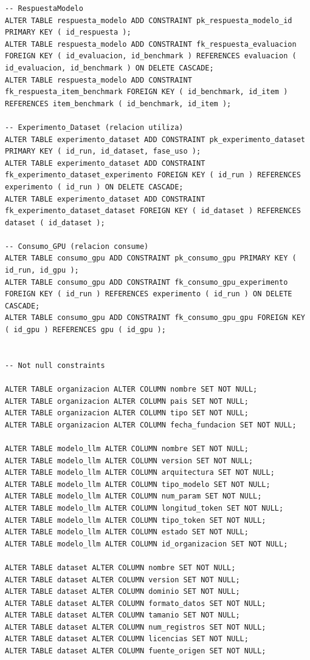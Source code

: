 \documentclass[12pt,a4paper]{article}
\begin{document}
\begin{lstlisting}
-- RespuestaModelo
ALTER TABLE respuesta_modelo ADD CONSTRAINT pk_respuesta_modelo_id PRIMARY KEY ( id_respuesta );
ALTER TABLE respuesta_modelo ADD CONSTRAINT fk_respuesta_evaluacion FOREIGN KEY ( id_evaluacion, id_benchmark ) REFERENCES evaluacion ( id_evaluacion, id_benchmark ) ON DELETE CASCADE;
ALTER TABLE respuesta_modelo ADD CONSTRAINT fk_respuesta_item_benchmark FOREIGN KEY ( id_benchmark, id_item ) REFERENCES item_benchmark ( id_benchmark, id_item );

-- Experimento_Dataset (relacion utiliza)
ALTER TABLE experimento_dataset ADD CONSTRAINT pk_experimento_dataset PRIMARY KEY ( id_run, id_dataset, fase_uso );
ALTER TABLE experimento_dataset ADD CONSTRAINT fk_experimento_dataset_experimento FOREIGN KEY ( id_run ) REFERENCES experimento ( id_run ) ON DELETE CASCADE;
ALTER TABLE experimento_dataset ADD CONSTRAINT fk_experimento_dataset_dataset FOREIGN KEY ( id_dataset ) REFERENCES dataset ( id_dataset );

-- Consumo_GPU (relacion consume)
ALTER TABLE consumo_gpu ADD CONSTRAINT pk_consumo_gpu PRIMARY KEY ( id_run, id_gpu );
ALTER TABLE consumo_gpu ADD CONSTRAINT fk_consumo_gpu_experimento FOREIGN KEY ( id_run ) REFERENCES experimento ( id_run ) ON DELETE CASCADE;
ALTER TABLE consumo_gpu ADD CONSTRAINT fk_consumo_gpu_gpu FOREIGN KEY ( id_gpu ) REFERENCES gpu ( id_gpu );


-- Not null constraints

ALTER TABLE organizacion ALTER COLUMN nombre SET NOT NULL;
ALTER TABLE organizacion ALTER COLUMN pais SET NOT NULL;
ALTER TABLE organizacion ALTER COLUMN tipo SET NOT NULL;
ALTER TABLE organizacion ALTER COLUMN fecha_fundacion SET NOT NULL;

ALTER TABLE modelo_llm ALTER COLUMN nombre SET NOT NULL;
ALTER TABLE modelo_llm ALTER COLUMN version SET NOT NULL;
ALTER TABLE modelo_llm ALTER COLUMN arquitectura SET NOT NULL;
ALTER TABLE modelo_llm ALTER COLUMN tipo_modelo SET NOT NULL;
ALTER TABLE modelo_llm ALTER COLUMN num_param SET NOT NULL;
ALTER TABLE modelo_llm ALTER COLUMN longitud_token SET NOT NULL;
ALTER TABLE modelo_llm ALTER COLUMN tipo_token SET NOT NULL;
ALTER TABLE modelo_llm ALTER COLUMN estado SET NOT NULL;
ALTER TABLE modelo_llm ALTER COLUMN id_organizacion SET NOT NULL;

ALTER TABLE dataset ALTER COLUMN nombre SET NOT NULL;
ALTER TABLE dataset ALTER COLUMN version SET NOT NULL;
ALTER TABLE dataset ALTER COLUMN dominio SET NOT NULL;
ALTER TABLE dataset ALTER COLUMN formato_datos SET NOT NULL;
ALTER TABLE dataset ALTER COLUMN tamanio SET NOT NULL;
ALTER TABLE dataset ALTER COLUMN num_registros SET NOT NULL;
ALTER TABLE dataset ALTER COLUMN licencias SET NOT NULL;
ALTER TABLE dataset ALTER COLUMN fuente_origen SET NOT NULL;


\end{lstlisting}
\end{document}

